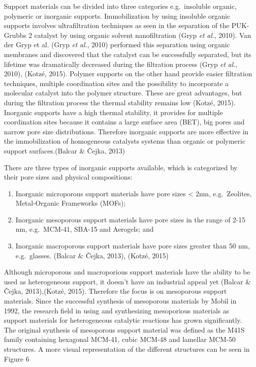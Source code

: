 \documentclass[]{article}
\providecommand{\tightlist}{%
  \setlength{\itemsep}{0pt}\setlength{\parskip}{0pt}}
\begin{document}
Support materials can be divided into three categories e.g.~insoluble
organic, polymeric or inorganic supports. Immobilization by using
insoluble organic supports involves ultrafiltration techniques as seen
in the separation of the PUK-Grubbs 2 catalyst by using organic solvent
nanofiltration (Gryp \emph{et al.}, 2010). Van der Gryp et al. (Gryp
\emph{et al.}, 2010) performed this separation using organic membranes
and discovered that the catalyst can be successfully separated, but its
lifetime was dramatically decreased during the filtration process (Gryp
\emph{et al.}, 2010), (Kotzé, 2015). Polymer supports on the other hand
provide easier filtration techniques, multiple coordination sites and
the possibility to incorporate a molecular catalyst into the polymer
structure. These are great advantages, but during the filtration process
the thermal stability remains low (Kotzé, 2015). Inorganic supports have
a high thermal stability, it provides for multiple coordination sites
because it contains a large surface area (BET), big pores and narrow
pore size distributions. Therefore inorganic supports are more effective
in the immobilization of homogeneous catalysts systems than organic or
polymeric support surfaces.(Balcar \& Čejka, 2013)

There are three types of inorganic supports available, which is
categorized by their pore sizes and physical compositions:

\begin{enumerate}
\def\labelenumi{\arabic{enumi}.}
\tightlist
\item
  Inorganic microporous support materials have pore sizes \textless{}
  2nm, e.g.~Zeolites, Metal-Organic Frameworks (MOFs);
\item
  Inorganic mesoporous support materials have pore sizes in the range of
  2-15 nm, e.g.~MCM-41, SBA-15 and Aerogels; and
\item
  Inorganic macroporous support materials have pore sizes greater than
  50 nm, e.g.~glasses. (Balcar \& Čejka, 2013), (Kotzé, 2015)
\end{enumerate}

Although microporous and macroporious support materials have the ability
to be used as heterogeneous support, it doesn't have an industrial
appeal yet (Balcar \& Čejka, 2013),(Kotzé, 2015). Therefore the focus is
on mesoporous support materials. Since the successful synthesis of
mesoporous materials by Mobil in 1992, the research field in using and
synthesizing mesoporious materials as support materials for
heterogeneous catalytic reactions has grown significantly. The original
synthesis of mesoporous support material was defined as the M41S family
containing hexagonal MCM-41, cubic MCM-48 and lamellar MCM-50
structures. A more visual representation of the different structures can
be seen in Figure 6
\end{document}
